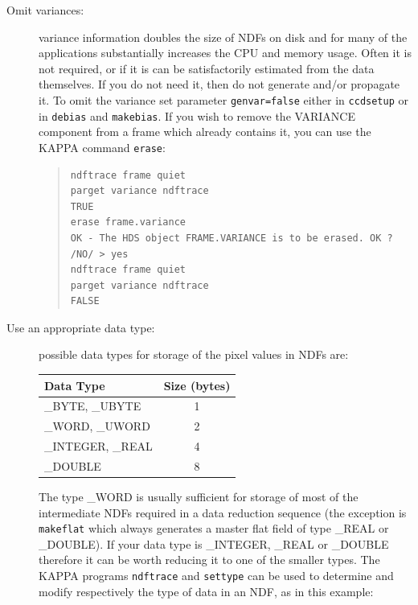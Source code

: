 \documentclass[twoside,11pt]{article}
\begin{document}
\begin{description}

  \item[Omit variances:] variance information doubles the size of NDFs on
   disk and for many of the applications substantially increases the CPU and
   memory usage.  
   Often it is not required, or if it is can be satisfactorily estimated 
   from the data themselves.
   If you do not need it, then do not generate and/or propagate it.
   To omit the variance set parameter {\tt genvar=false} either in
   {\tt ccdsetup} or in {\tt debias} and {\tt makebias}.
   If you wish to remove the VARIANCE component from a frame which 
   already contains it, you can use the KAPPA command {\tt erase}:

  \begin{quote}
  \begin{verbatim}
ndftrace frame quiet
parget variance ndftrace
TRUE
erase frame.variance
OK - The HDS object FRAME.VARIANCE is to be erased. OK ? /NO/ > yes
ndftrace frame quiet
parget variance ndftrace
FALSE
\end{verbatim}
  \end{quote}

  \item[Use an appropriate data type:] possible data types for storage of
   the pixel values in NDFs are:

  \begin{center}
  \begin{tabular}{lc}
   Data Type         & Size (bytes) \\ \hline
   \_BYTE, \_UBYTE   & 1 \\
   \_WORD, \_UWORD   & 2 \\
   \_INTEGER, \_REAL & 4 \\
   \_DOUBLE          & 8 \\
  \end{tabular}
  \end{center}

   The type \_WORD is usually sufficient for storage of most 
   of the intermediate NDFs required in a data reduction sequence
   (the exception is {\tt makeflat} which always generates a master flat
   field of type \_REAL or \_DOUBLE).
   If your data type is \_INTEGER, \_REAL or \_DOUBLE therefore
   it can be worth reducing it to one of the smaller types.
   The KAPPA programs {\tt ndftrace} and {\tt settype} can be used to
   determine and modify respectively the type of data in an NDF, as in this
   example:


\end{description}
\end{document}
